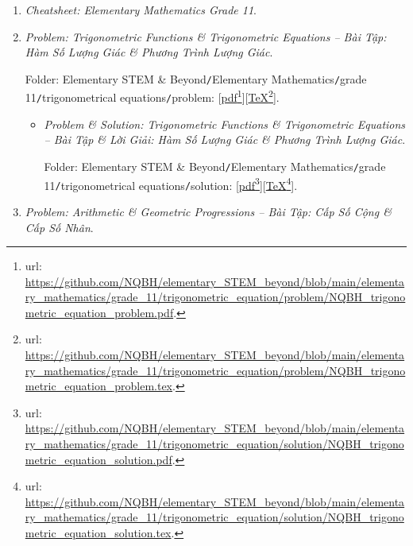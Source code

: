 \documentclass[12pt]{article}
\begin{document}
\begin{enumerate}
	\item {\it Cheatsheet: Elementary Mathematics Grade 11}.
	\item {\it Problem: Trigonometric Functions \& Trigonometric Equations -- Bài Tập: Hàm Số Lượng Giác \& Phương Trình Lượng Giác}.
	
	Folder: {\sf Elementary STEM \& Beyond{\tt/}Elementary Mathematics{\tt/}grade 11{\tt/}trigonometrical equations{\tt/}problem}: [\href{https://github.com/NQBH/elementary_STEM_beyond/blob/main/elementary_mathematics/grade_11/trigonometric_equation/problem/NQBH_trigonometric_equation_problem.pdf}{pdf}\footnote{{\sc url}: \url{https://github.com/NQBH/elementary_STEM_beyond/blob/main/elementary_mathematics/grade_11/trigonometric_equation/problem/NQBH_trigonometric_equation_problem.pdf}.}][\href{https://github.com/NQBH/elementary_STEM_beyond/blob/main/elementary_mathematics/grade_11/trigonometric_equation/problem/NQBH_trigonometric_equation_problem.tex}{\TeX}\footnote{{\sc url}: \url{https://github.com/NQBH/elementary_STEM_beyond/blob/main/elementary_mathematics/grade_11/trigonometric_equation/problem/NQBH_trigonometric_equation_problem.tex}.}].
	\begin{itemize}
		\item {\it Problem \& Solution: Trigonometric Functions \& Trigonometric Equations -- Bài Tập \& Lời Giải: Hàm Số Lượng Giác \& Phương Trình Lượng Giác}.
		
		Folder: {\sf Elementary STEM \& Beyond{\tt/}Elementary Mathematics{\tt/}grade 11{\tt/}trigonometrical equations{\tt/}solution}: [\href{https://github.com/NQBH/elementary_STEM_beyond/blob/main/elementary_mathematics/grade_11/trigonometric_equation/solution/NQBH_trigonometric_equation_solution.pdf}{pdf}\footnote{{\sc url}: \url{https://github.com/NQBH/elementary_STEM_beyond/blob/main/elementary_mathematics/grade_11/trigonometric_equation/solution/NQBH_trigonometric_equation_solution.pdf}.}][\href{https://github.com/NQBH/elementary_STEM_beyond/blob/main/elementary_mathematics/grade_11/trigonometric_equation/solution/NQBH_trigonometric_equation_solution.tex}{\TeX}\footnote{{\sc url}: \url{https://github.com/NQBH/elementary_STEM_beyond/blob/main/elementary_mathematics/grade_11/trigonometric_equation/solution/NQBH_trigonometric_equation_solution.tex}.}].
	\end{itemize}
	\item {\it Problem: Arithmetic \& Geometric Progressions -- Bài Tập: Cấp Số Cộng \& Cấp Số Nhân}.
	

\end{enumerate}
\end{document}
